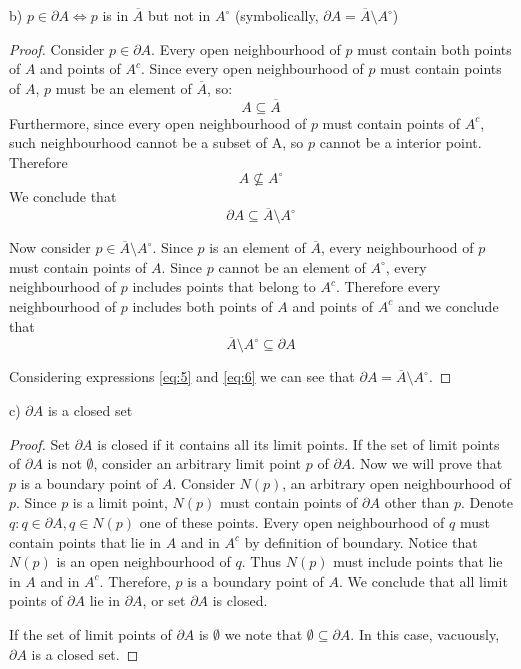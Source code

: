 \documentclass{article}
\begin{document}
\begin{tcolorbox}
b) $p \in \partial A \iff p$ is in $\overline{A}$ but not in $A^\circ$
(symbolically, $\partial A = \overline{A} \setminus A^\circ$)
\end{tcolorbox}

\begin{proof}

Consider $p \in \partial A$.
Every open neighbourhood of $p$ must contain both points of $A$ and points of $A^c$.
Since every open neighbourhood of $p$ must contain points of $A$, $p$ must be an element of $\overline{A}$, so:
\[ A \subseteq \overline{A} \]
Furthermore, since every open neighbourhood of $p$ must contain points of $A^c$, such neighbourhood cannot be a subset of A, so $p$ cannot be a interior point.
Therefore
\[ A \nsubseteq A^\circ \]
We conclude that
\begin{equation} \label{eq:5}
    \partial A \subseteq \overline{A} \setminus A^\circ
\end{equation}

Now consider $p \in \overline{A} \setminus A^\circ$. Since $p$ is an element of $\overline{A}$, every neighbourhood of $p$ must contain points of $A$.
Since $p$ cannot be an element of $A^\circ$, every neighbourhood of $p$ includes points that belong to $A^c$.
Therefore every neighbourhood of $p$ includes both points of $A$ and points of $A^c$ and we conclude that
\begin{equation} \label{eq:6}
    \overline{A} \setminus A^\circ \subseteq \partial A
\end{equation}

Considering expressions \ref{eq:5} and \ref{eq:6} we can see that $\partial A = \overline{A} \setminus A^\circ$. 

\end{proof}

\begin{tcolorbox}
c) $\partial A$ is a closed set
\end{tcolorbox}

\begin{proof}

Set $\partial A$ is closed if it contains all its limit points.
If the set of limit points of $\partial A$ is not $\emptyset$, consider an arbitrary limit point $p$ of $\partial A$.
Now we will prove that $p$ is a boundary point of $A$.
Consider $N(p)$, an arbitrary open neighbourhood of $p$.
Since $p$ is a limit point, $N(p)$ must contain points of $\partial A$ other than $p$. 
Denote $q : q \in \partial A, q \in N(p)$ one of these points.
Every open neighbourhood of $q$ must contain points that lie in $A$ and in $A^c$ by definition of boundary.
Notice that $N(p)$ is an open neighbourhood of $q$.
Thus $N(p)$ must include points that lie in $A$ and in $A^c$.
Therefore, $p$ is a boundary point of $A$.
We conclude that all limit points of $\partial A$ lie in $\partial A$, or set $\partial A$ is closed. 

If the set of limit points of $\partial A$ is $\emptyset$ we note that $\emptyset \subseteq \partial A$.
In this case, vacuously, $\partial A$ is a closed set.

\end{proof}
\end{document}
